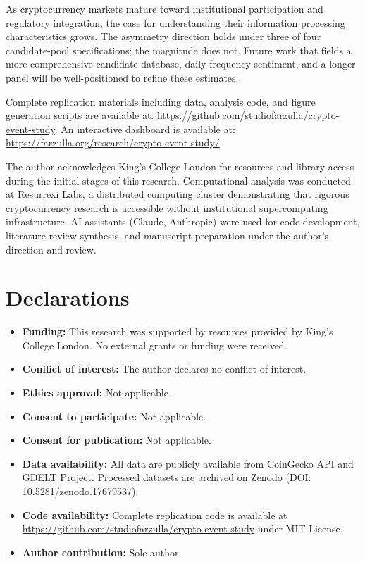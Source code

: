 \documentclass[pdflatex,sn-mathphys-num]{sn-jnl}
\theoremstyle{thmstyleone}
\theoremstyle{thmstyletwo}
\theoremstyle{thmstylethree}
\begin{document}
As cryptocurrency markets mature toward institutional participation and regulatory integration, the case for understanding their information processing characteristics grows. The asymmetry direction holds under three of four candidate-pool specifications; the magnitude does not. Future work that fields a more comprehensive candidate database, daily-frequency sentiment, and a longer panel will be well-positioned to refine these estimates.


\backmatter


Complete replication materials including data, analysis code, and figure generation scripts are available at: \url{https://github.com/studiofarzulla/crypto-event-study}. An interactive dashboard is available at: \url{https://farzulla.org/research/crypto-event-study/}.


The author acknowledges King's College London for resources and library access during the initial stages of this research. Computational analysis was conducted at Resurrexi Labs, a distributed computing cluster demonstrating that rigorous cryptocurrency research is accessible without institutional supercomputing infrastructure. AI assistants (Claude, Anthropic) were used for code development, literature review synthesis, and manuscript preparation under the author's direction and review.

\section*{Declarations}

\begin{itemize}
\item \textbf{Funding:} This research was supported by resources provided by King's College London. No external grants or funding were received.
\item \textbf{Conflict of interest:} The author declares no conflict of interest.
\item \textbf{Ethics approval:} Not applicable.
\item \textbf{Consent to participate:} Not applicable.
\item \textbf{Consent for publication:} Not applicable.
\item \textbf{Data availability:} All data are publicly available from CoinGecko API and GDELT Project. Processed datasets are archived on Zenodo (DOI: 10.5281/zenodo.17679537).
\item \textbf{Code availability:} Complete replication code is available at \url{https://github.com/studiofarzulla/crypto-event-study} under MIT License.
\item \textbf{Author contribution:} Sole author.
\end{itemize}
\end{document}
